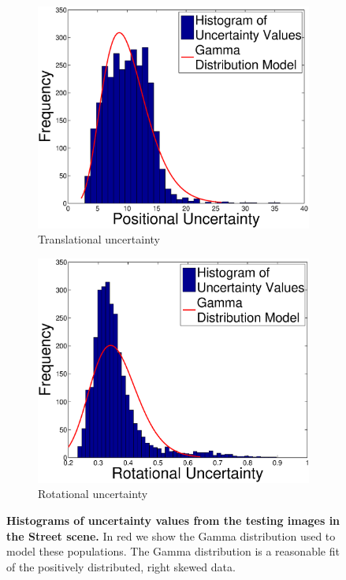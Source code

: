 \begin{figure}
\begin{center}
	\begin{subfigure}[b]{0.49\linewidth}
        \includegraphics[width=\linewidth]{Uncertainty/kingsparade_positional_uncertainty_histogram.eps}
        \caption{Translational uncertainty}
    \end{subfigure}
    	\begin{subfigure}[b]{0.49\linewidth}
        \includegraphics[width=\linewidth]{Uncertainty/kingsparade_rotational_uncertainty_histogram.eps}
        \caption{Rotational uncertainty}
    \end{subfigure}
\end{center}
   \caption[Histograms of uncertainty values from the testing images in the Street scene.]{\textbf{Histograms of uncertainty values from the testing images in the Street scene.} In red we show the Gamma distribution used to model these populations. The Gamma distribution is a reasonable fit of the positively distributed, right skewed data.}
\label{fig:uncertainty_distribution}
\end{figure}

